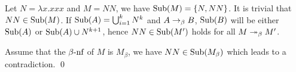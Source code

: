\begin{pf} \rm
 Let $N = \lambda x.xxx$ and $M=NN$, we have
 $\textrm{Sub}(M) = \{ N, NN\}$. It is trivial that $NN \in \textrm{Sub}(M)$.
 If $\textrm{Sub}(A) = \bigcup_{i=1}^{k} N^k$ and $A \rightarrow_{\beta} B$, $\textrm{Sub}(B)$ will be either
  $\textrm{Sub}(A)$ or $\textrm{Sub}(A)\cup N^{k+1}$, hence
 $NN\in\textrm{Sub}(M')$ holds for all $M \twoheadrightarrow_{\beta} M'$.

 Assume that the $\beta\textrm{-nf}$ of $M$ is $M_\beta$, we have $NN\in\textrm{Sub}(M_\beta)$ which
 leads to a contradiction. \qed
\end{pf}
